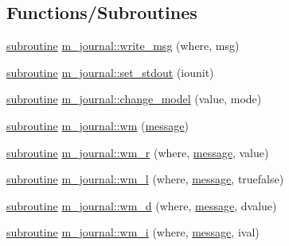 \subsection*{Functions/\+Subroutines}
\begin{DoxyCompactItemize}
\item 
\hyperlink{M__stopwatch_83_8txt_acfbcff50169d691ff02d4a123ed70482}{subroutine} \hyperlink{namespacem__journal_a98698c251ec1883612ae40c5f2443fd9}{m\+\_\+journal\+::write\+\_\+msg} (where, msg)
\item 
\hyperlink{M__stopwatch_83_8txt_acfbcff50169d691ff02d4a123ed70482}{subroutine} \hyperlink{namespacem__journal_a0f2ac99f3da62381d2466c150830b9e0}{m\+\_\+journal\+::set\+\_\+stdout} (iounit)
\item 
\hyperlink{M__stopwatch_83_8txt_acfbcff50169d691ff02d4a123ed70482}{subroutine} \hyperlink{namespacem__journal_a358c4bd99444e0e946b3aaba5f278698}{m\+\_\+journal\+::change\+\_\+model} (value, mode)
\item 
\hyperlink{M__stopwatch_83_8txt_acfbcff50169d691ff02d4a123ed70482}{subroutine} \hyperlink{namespacem__journal_a98479e5ace98340f7519470b96d3197d}{m\+\_\+journal\+::wm} (\hyperlink{M__stopwatch_83_8txt_aa4313e9a55405841f95e6550cd87fc3b}{message})
\item 
\hyperlink{M__stopwatch_83_8txt_acfbcff50169d691ff02d4a123ed70482}{subroutine} \hyperlink{namespacem__journal_ad22893c3621042df7d66b9f3864aa457}{m\+\_\+journal\+::wm\+\_\+r} (where, \hyperlink{M__stopwatch_83_8txt_aa4313e9a55405841f95e6550cd87fc3b}{message}, value)
\item 
\hyperlink{M__stopwatch_83_8txt_acfbcff50169d691ff02d4a123ed70482}{subroutine} \hyperlink{namespacem__journal_a3229165c77bc7f39fbf88fbcfbdb401e}{m\+\_\+journal\+::wm\+\_\+l} (where, \hyperlink{M__stopwatch_83_8txt_aa4313e9a55405841f95e6550cd87fc3b}{message}, truefalse)
\item 
\hyperlink{M__stopwatch_83_8txt_acfbcff50169d691ff02d4a123ed70482}{subroutine} \hyperlink{namespacem__journal_ae4e688044197dd70bd47b4d7c0bb7306}{m\+\_\+journal\+::wm\+\_\+d} (where, \hyperlink{M__stopwatch_83_8txt_aa4313e9a55405841f95e6550cd87fc3b}{message}, dvalue)
\item 
\hyperlink{M__stopwatch_83_8txt_acfbcff50169d691ff02d4a123ed70482}{subroutine} \hyperlink{namespacem__journal_a931487b48fc9268afb0c286c3c3892ad}{m\+\_\+journal\+::wm\+\_\+i} (where, \hyperlink{M__stopwatch_83_8txt_aa4313e9a55405841f95e6550cd87fc3b}{message}, ival)
\end{DoxyCompactItemize}
